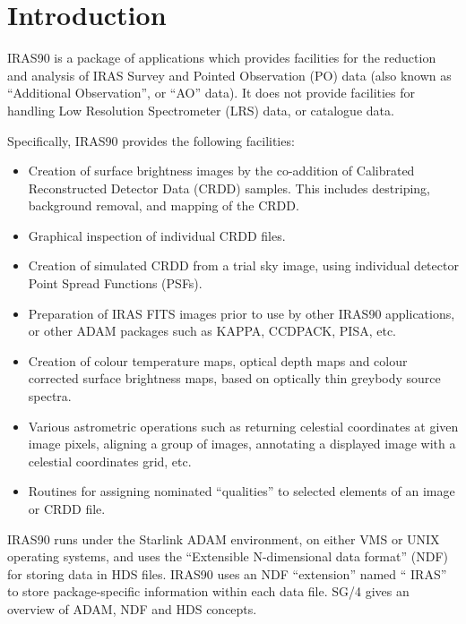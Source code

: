 \documentclass[11pt,nolof,noabs]{starlink}
\begin{document}
\scfrontmatter

\section{Introduction}
{\small IRAS90} is a package of applications which provides facilities for the
reduction and analysis of {\small IRAS} Survey and Pointed Observation (PO) data (also
known as ``Additional Observation'', or ``AO'' data). It does not provide
facilities for handling Low Resolution Spectrometer (LRS) data, or catalogue
data.

Specifically, {\small IRAS90} provides the following facilities:

\begin{itemize}

\item Creation of surface brightness images by the co-addition of Calibrated
Reconstructed Detector Data ({\small CRDD}) samples. This includes destriping,
background removal, and mapping of the {\small CRDD}.

\item Graphical inspection of individual {\small CRDD} files.

\item Creation of simulated {\small CRDD} from a trial sky image, using individual
detector Point Spread Functions (PSFs).

\item Preparation of {\small IRAS} {\small FITS} images prior to use by other
{\small IRAS90} applications, or other {\small ADAM} packages such as {\small
KAPPA, CCDPACK, PISA,} etc.

\item Creation of colour temperature maps, optical depth maps and colour
corrected surface brightness maps, based on optically thin greybody source
spectra.

\item Various astrometric operations such as returning celestial coordinates
at given image pixels, aligning a group of images, annotating a displayed
image with a celestial coordinates grid, etc.

\item Routines for assigning nominated ``qualities'' to selected elements of an
image or {\small CRDD} file.

\end{itemize}

{\small IRAS90} runs under the Starlink {\small ADAM} environment, on either
{\small VMS} or {\small UNIX} operating systems, and uses the ``Extensible
N-dimensional data format'' ({\small NDF}) for storing data in {\small HDS}
files. {\small IRAS90} uses an {\small NDF} ``extension'' named ``{\small
IRAS}'' to store package-specific information within each data file. SG/4 gives
an overview of {\small ADAM}, {\small NDF} and {\small HDS} concepts.
\end{document}
